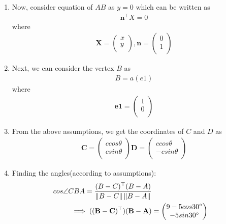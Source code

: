 \documentclass{article}
\providecommand{\norm}[1]{\left\lVert#1\right\rVert}
\newcommand{\myvec}[1]{\ensuremath{\begin{pmatrix}#1\end{pmatrix}}}
\let\vec\mathbf
\begin{document}
\begin{enumerate}
\item Now, consider equation of $AB$ as $y = 0$ which can be written as
	\begin{align}
                \vec{n}^{\top}X = 0
        \end{align} where
                \begin{align}
                        \vec{X} = \myvec{
                                  x\\
                                  y\\
                                  },
                        \vec{n} = \myvec{
                                  0\\
                                  1\\
                                  }
                \end{align}
\item Next, we can consider the vertex $B$ as
        \begin{align}
                B = a(e1)
        \end{align} where
        \begin{align}
                \vec{e1}=\myvec{
                        1\\
                        0\\
                        }
        \end{align}
\item From the above assumptions, we get the coordinates of $C$ and $D$ as
        \begin{align}
                \vec{C} = \myvec{
                        c cos\theta\\
                        c sin\theta\\
                        }
                \vec{D} = \myvec{
                        c cos\theta\\
                        -c sin\theta\\
                        }
        \end{align}
\item Finding the angles(according to assumptions):
        \begin{align}
		cos\angle{CBA} = \frac{(B-C)^\top(B-A)}{\norm{B-C}\norm{B-A}}\\
        \implies \vec{((B-C)^\top)(B-A)} &= \myvec{
                                         9-5 cos30\degree{}\\
                                         -5 sin30\degree{}\\
}
\end{align}
\end{enumerate}
\end{document}
